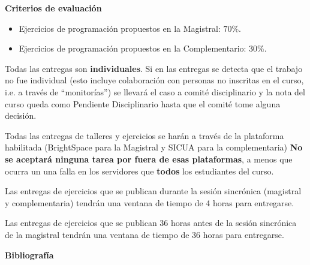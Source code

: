 \documentclass[letterpaper,10pt,onecolumn]{article}
\begin{document}


\vspace*{0.5cm} 
\noindent\textbf{\large {} \quad Criterios de
  evaluaci\'on}\\[-0.2cm] 

\begin{itemize}
    \item Ejercicios de programaci\'on propuestos en la Magistral: $70\%$.  
    \item Ejercicios de programaci\'on propuestos en la Complementario: $30\%$. 
\end{itemize}

Todas las entregas son
\textbf{individuales}.  
Si en las entregas se detecta que el trabajo no fue
individual (esto incluye colaboraci\'on con personas no inscritas en
el curso, i.e. a trav\'es de ``monitor\'ias'') se llevar\'a el caso a
comit\'e disciplinario y la nota del curso queda como Pendiente
Disciplinario hasta que el comit\'e tome alguna decisi\'on. 

Todas las entregas de talleres y ejercicios se har\'an a trav\'es de 
la plataforma habilitada (BrightSpace para la Magistral y SICUA para
la complementaria)
{\bf No se aceptar\'a ninguna tarea por fuera de esas plataformas}, a
menos que ocurra un una falla en los servidores que {\bf todos} los
estudiantes del curso. 

Las entregas de ejercicios que se publican durante la sesi\'on
sincr\'onica (magistral y complementaria) tendr\'an una ventana de
tiempo de 4 horas para entregarse.

Las entregas de ejercicios que se publican 36 horas antes de la
sesi\'on sincr\'onica de la magistral tendr\'an una ventana de tiempo
de 36 horas para entregarse.



\vspace*{0.5cm} 

\noindent\textbf{\large {} \quad
  Bibliograf\'ia}\\[-0.2cm] 

\end{document}
